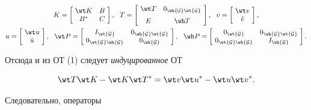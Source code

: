 \begin{gather}


K=\left[\ \begin{matrix}


\wt K & B \\ B^* & C \end{matrix}\ \right],\ \


T=\left[\ \begin{matrix} \wt T & 0_{\wh {\cal G} \wt {\cal G}}\\[2mm]


E & \wh T \end{matrix}\ \right],\ \


v=\left[\ \begin{matrix} \wt v \\ \check v \end{matrix}\ \right], \notag \\


%


u=\left[\ \begin{matrix} \wt u \\ \check u \end{matrix}\ \right],\ \


\wt P=\left[ \ \begin{matrix}


I_{\wt {\cal G}} & 0_{\wh {\cal G} \wt {\cal G}} \\


0_{\wt {\cal G} \wh {\cal G}} & 0_{\wh {\cal G}}


\end{matrix}\ \right], \ \


\wh P=\left[\ \begin{matrix}


0_{\wt {\cal G}} & 0_{\wh {\cal G} \wt {\cal G}} \\


0_{\wt {\cal G} \wh {\cal G}} & I_{\wh {\cal G}}


\end{matrix}\ \right].


\end{gather}





Отсюда и из ОТ (1) следует {\em индуцированное} ОТ


$$


\wt T\wt K-\wt K\wt T^*=\wt v\wt u{}^*-\wt u\wt v{}^*.


$$


Следовательно, операторы


